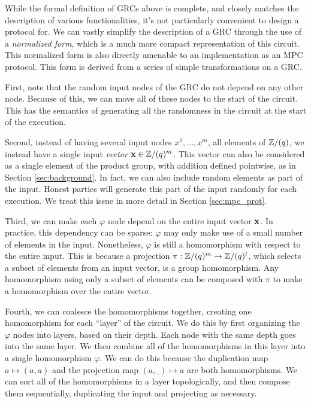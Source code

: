 While the formal definition of GRCs above is complete, and closely
matches the description of various functionalities, it's not
particularly convenient to design a protocol for.
We can vastly simplify the description of a GRC through the use
of a \emph{normalized form}, which is a much more compact representation
of this circuit.
This normalized form is also directly amenable to an implementation
as an MPC protocol.
This form is derived from a series of simple transformations on
a GRC.

First, note that the random input nodes of the GRC do not depend on
any other node.
Because of this, we can move all of these nodes
to the start of the circuit.
This has the semantics of generating
all the randomness in the circuit at the start of the execution.

Second, instead of having several input nodes $x^1, \ldots, x^m$,
all elements of $\mathbb{Z}/(q)$, we
instead have a single input \emph{vector} $\textbf{x} \in \mathbb{Z}/(q)^m$.
This vector can also be considered as a single element of the product
group, with addition defined pointwise, as in Section \ref{sec:background}.
In fact, we can also include random elements as part of the input.
Honest parties will generate this part of the input
randomly for each execution.
We treat this issue in more detail in Section \ref{sec:mpc_prot}.

Third, we can make each $\varphi$ node depend on the entire
input vector $\textbf{x}$.
In practice, this dependency can be sparse: $\varphi$
may only make use of a small number of elements in the input.
Nonetheless, $\varphi$ is still a homomorphism with respect
to the entire input.
This is because a projection $\pi : \mathbb{Z}/(q)^m \to \mathbb{Z}/(q)^l$, which selects
a subset of elements from an input vector, is a group homomorphism.
Any homomorphism using only a subset of elements can be composed with $\pi$
to make a homomorphism over the entire vector.

Fourth, we can coalesce the homomorphisms together, creating one
homomorphism for each ``layer'' of the circuit.
We do this by first organizing the $\varphi$ nodes into layers,
based on their depth.
Each node with the same depth goes into the same layer.
We then combine all of the homomorphisms in this layer into
a single homomorphism $\varphi$.
We can do this because the duplication map $a \mapsto (a, a)$
and the projection map $(a, \_) \mapsto a$ are both homomorphisms.
We can sort all of the homomorphisms in a layer topologically, and then compose
them sequentially, duplicating the input and projecting as necessary.

